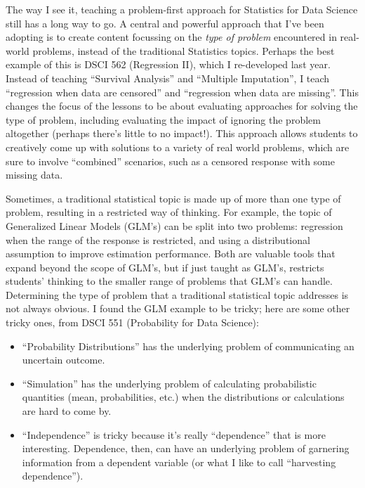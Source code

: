 \documentclass[]{article}
\providecommand{\tightlist}{%
  \setlength{\itemsep}{0pt}\setlength{\parskip}{0pt}}
\begin{document}
The way I see it, teaching a problem-first approach for Statistics for Data Science still has a long way to go. A central and powerful approach that I've been adopting is to create content focussing on the \emph{type of problem} encountered in real-world problems, instead of the traditional Statistics topics. Perhaps the best example of this is DSCI 562 (Regression II), which I re-developed last year. Instead of teaching ``Survival Analysis'' and ``Multiple Imputation'', I teach ``regression when data are censored'' and ``regression when data are missing''. This changes the focus of the lessons to be about evaluating approaches for solving the type of problem, including evaluating the impact of ignoring the problem altogether (perhaps there's little to no impact!). This approach allows students to creatively come up with solutions to a variety of real world problems, which are sure to involve ``combined'' scenarios, such as a censored response with some missing data.

Sometimes, a traditional statistical topic is made up of more than one type of problem, resulting in a restricted way of thinking. For example, the topic of Generalized Linear Models (GLM's) can be split into two problems: regression when the range of the response is restricted, and using a distributional assumption to improve estimation performance. Both are valuable tools that expand beyond the scope of GLM's, but if just taught as GLM's, restricts students' thinking to the smaller range of problems that GLM's can handle.
Determining the type of problem that a traditional statistical topic addresses is not always obvious. I found the GLM example to be tricky; here are some other tricky ones, from DSCI 551 (Probability for Data Science):

\begin{itemize}
\tightlist
\item
  ``Probability Distributions'' has the underlying problem of communicating an uncertain outcome.
\item
  ``Simulation'' has the underlying problem of calculating probabilistic quantities (mean, probabilities, etc.) when the distributions or calculations are hard to come by.
\item
  ``Independence'' is tricky because it's really ``dependence'' that is more interesting. Dependence, then, can have an underlying problem of garnering information from a dependent variable (or what I like to call ``harvesting dependence'').
\end{itemize}
\end{document}
